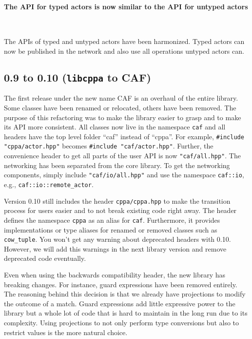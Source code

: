 \paragraph{The API for typed actors is now similar to the API for untyped actors}

~

The APIs of typed and untyped actors have been harmonized.
Typed actors can now be published in the network and also use all operations untyped actors can.

\clearpage
\subsection{0.9 to 0.10 (\texttt{libcppa} to CAF)}

The first release under the new name CAF is an overhaul of the entire library.
Some classes have been renamed or relocated, others have been removed.
The purpose of this refactoring was to make the library easier to grasp and to make its API more consistent.
All classes now live in the namespace \lstinline^caf^ and all headers have the top level folder ``caf'' instead of ``cppa''.
For example, \lstinline^#include "cppa/actor.hpp"^ becomes \lstinline^#include "caf/actor.hpp"^.
Further, the convenience header to get all parts of the user API is now \lstinline^"caf/all.hpp"^.
The networking has been separated from the core library.
To get the networking components, simply include \lstinline^"caf/io/all.hpp"^ and use the namespace \lstinline^caf::io^, e.g., \lstinline^caf::io::remote_actor^.

Version 0.10 still includes the header \lstinline^cppa/cppa.hpp^ to make the transition process for users easier and to not break existing code right away.
The header defines the namespace \lstinline^cppa^ as an alias for \lstinline^caf^.
Furthermore, it provides implementations or type aliases for renamed or removed classes such as \lstinline^cow_tuple^.
You won't get any warning about deprecated headers with 0.10.
However, we will add this warnings in the next library version and remove deprecated code eventually.

Even when using the backwards compatibility header, the new library has breaking changes.
For instance, guard expressions have been removed entirely.
The reasoning behind this decision is that we already have projections to modify the outcome of a match.
Guard expressions add little expressive power to the library but a whole lot of code that is hard to maintain in the long run due to its complexity.
Using projections to not only perform type conversions but also to restrict values is the more natural choice.

